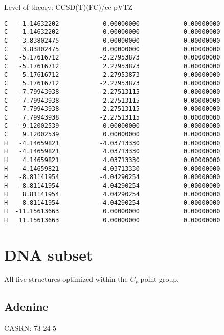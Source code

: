 \documentclass[journal=jctcce,manuscript=article,layout=traditional]{achemso}
\newcommand{\TZ}{cc-pVTZ}
\begin{document}
\begin{singlespace}
\noindent Level of theory: CCSD(T)(FC)/{\TZ}
\begin{verbatim}
C   -1.14632202            0.00000000            0.00000000
C    1.14632202            0.00000000            0.00000000
C   -3.83802475            0.00000000            0.00000000
C    3.83802475            0.00000000            0.00000000
C   -5.17616712           -2.27953873            0.00000000
C   -5.17616712            2.27953873            0.00000000
C    5.17616712            2.27953873            0.00000000
C    5.17616712           -2.27953873            0.00000000
C   -7.79943938           -2.27513115            0.00000000
C   -7.79943938            2.27513115            0.00000000
C    7.79943938            2.27513115            0.00000000
C    7.79943938           -2.27513115            0.00000000
C   -9.12002539            0.00000000            0.00000000
C    9.12002539            0.00000000            0.00000000
H   -4.14659821           -4.03713330            0.00000000
H   -4.14659821            4.03713330            0.00000000
H    4.14659821            4.03713330            0.00000000
H    4.14659821           -4.03713330            0.00000000
H   -8.81141954           -4.04290254            0.00000000
H   -8.81141954            4.04290254            0.00000000
H    8.81141954            4.04290254            0.00000000
H    8.81141954           -4.04290254            0.00000000
H  -11.15613663            0.00000000            0.00000000
H   11.15613663            0.00000000            0.00000000
\end{verbatim}
\end{singlespace}

\clearpage

\section{DNA subset}

All five structures optimized within the $C_s$ point group.

\subsection{Adenine}

CASRN:  73-24-5
\end{document}
